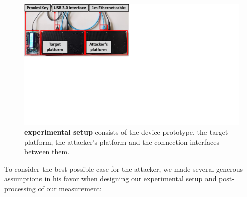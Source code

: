\begin{figure}[t]
  \centering
    \includegraphics[trim={0 11cm 17cm 0}, clip, width=0.8\linewidth]{chapters/ProximiTEE/figures/Setup2.pdf}
    \caption[\name experimental setup]{\textbf{\name experimental setup} consists of the \device device prototype, the target platform, the attacker's platform and the connection interfaces between them.}

    \label{fig:setup}
\end{figure}

To consider the best possible case for the attacker, we made several generous assumptions in his favor when designing our experimental setup and post-processing of our measurement:

